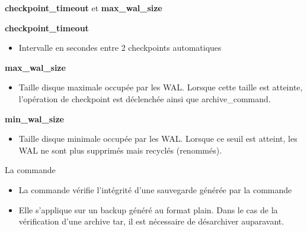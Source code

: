 
\begin{frame}{\textbf{checkpoint\_timeout} et \textbf{max\_wal\_size}}

   \textbf{checkpoint\_timeout}
\begin{itemize}
   \item Intervalle en secondes entre 2 checkpoints automatiques
\end{itemize}

   \textbf{max\_wal\_size}
\begin{itemize}
   \item Taille disque maximale occupée par les WAL. Lorsque cette taille est atteinte, l'opération de checkpoint est déclenchée ainsi que \textsf{archive\_command}.
\end{itemize}

   \textbf{min\_wal\_size}
\begin{itemize}
   \item Taille disque minimale occupée par les WAL. Lorsque ce seuil est atteint, les WAL ne sont plus supprimés mais recyclés (renommés).
\end{itemize}

\begin{toile}
\end{toile}

\end{frame}


\begin{frame}[fragile]{La commande }

\begin{itemize}

   \item La commande  vérifie l'intégrité d'une sauvegarde générée par la commande 
   \item Elle s'applique sur un backup généré au format plain. Dans le cas de la vérification d'une archive tar, il est nécessaire de désarchiver auparavant.

\end{itemize}

\begin{toile}
\end{toile}

\end{frame}

